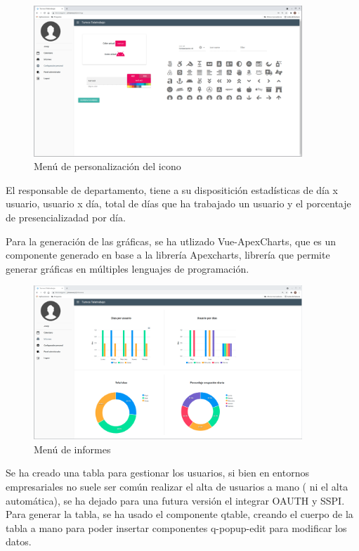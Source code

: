 \documentclass[11pt,spanish,listoffigures,listoftables]{tfgetsinf}
\begin{document}
\begin{figure}[ht!] %
  \includegraphics[width=0.90\textwidth]{img/opcionesweb.png}
  \caption{Menú de personalización del icono}
  \label{fig:menupersonalizacion}
\end{figure}

El responsable de departamento, tiene a su dispositición estadísticas de día x usuario, usuario x día, total de días que ha trabajado un usuario y el porcentaje de presencializadad por día. 

Para la generación de las gráficas, se ha utlizado Vue-ApexCharts, que es un componente generado en base a la librería Apexcharts, librería que permite generar gráficas en múltiples lenguajes de programación.
\newpage

\begin{figure}[ht!] %
  \includegraphics[width=0.90\textwidth]{img/informes.png}
  \caption{Menú de informes}
  \label{fig:menuinformes}
\end{figure}

Se ha creado una tabla para gestionar los usuarios, si bien en entornos empresariales no suele ser común realizar el alta de usuarios a mano ( ni el alta automática), se ha dejado para una futura versión el integrar OAUTH  y SSPI.
Para generar la tabla, se ha usado el componente qtable, creando el cuerpo de la tabla a mano para poder insertar componentes q-popup-edit para modificar los datos. 
\end{document}
